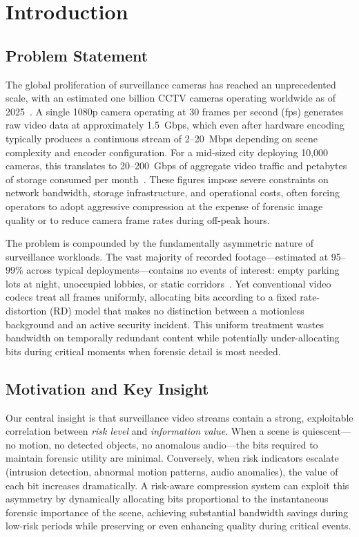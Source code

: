 \section{Introduction}
\label{sec:introduction}

\subsection{Problem Statement}

The global proliferation of surveillance cameras has reached an unprecedented scale, with an estimated one billion CCTV cameras operating worldwide as of 2025~\cite{smith2025surveillance}. A single 1080p camera operating at 30 frames per second (fps) generates raw video data at approximately 1.5~Gbps, which even after hardware encoding typically produces a continuous stream of 2--20~Mbps depending on scene complexity and encoder configuration. For a mid-sized city deploying 10{,}000 cameras, this translates to 20--200~Gbps of aggregate video traffic and petabytes of storage consumed per month~\cite{wang2024urban}. These figures impose severe constraints on network bandwidth, storage infrastructure, and operational costs, often forcing operators to adopt aggressive compression at the expense of forensic image quality or to reduce camera frame rates during off-peak hours.

The problem is compounded by the fundamentally asymmetric nature of surveillance workloads. The vast majority of recorded footage---estimated at 95--99\% across typical deployments---contains no events of interest: empty parking lots at night, unoccupied lobbies, or static corridors~\cite{chen2023efficiency}. Yet conventional video codecs treat all frames uniformly, allocating bits according to a fixed rate-distortion (RD) model that makes no distinction between a motionless background and an active security incident. This uniform treatment wastes bandwidth on temporally redundant content while potentially under-allocating bits during critical moments when forensic detail is most needed.

\subsection{Motivation and Key Insight}

Our central insight is that surveillance video streams contain a strong, exploitable correlation between \emph{risk level} and \emph{information value}. When a scene is quiescent---no motion, no detected objects, no anomalous audio---the bits required to maintain forensic utility are minimal. Conversely, when risk indicators escalate (intrusion detection, abnormal motion patterns, audio anomalies), the value of each bit increases dramatically. A risk-aware compression system can exploit this asymmetry by dynamically allocating bits proportional to the instantaneous forensic importance of the scene, achieving substantial bandwidth savings during low-risk periods while preserving or even enhancing quality during critical events.


